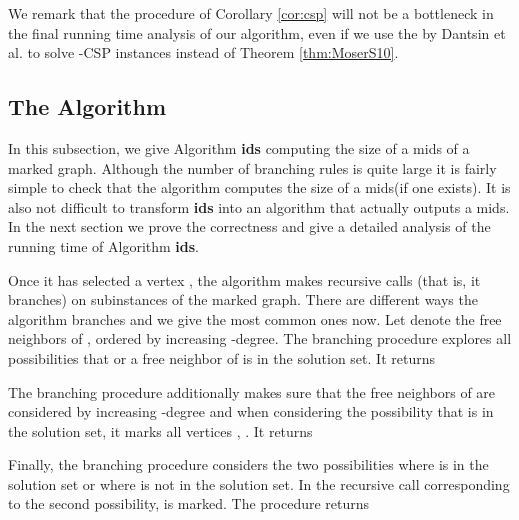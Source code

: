\documentclass[a4paper,10pt]{article}
\theoremstyle{plain}
\theoremstyle{definition}
\theoremstyle{remark}
\newcommand{\mids}{mids\xspace}
\newcommand{\CSPpb}{\textsc{CSP}\xspace}
\begin{document}
We remark that the procedure of Corollary \ref{cor:csp} will not be a bottleneck in the final
running time analysis of our algorithm, even if we use the  by Dantsin et al. \cite{Dantsin}
to solve -\CSPpb instances instead of Theorem \ref{thm:MoserS10}.

















\subsection{The Algorithm}
\label{sec:algo}

In this subsection, we give Algorithm {\bf ids} computing the size of a \mids
of a marked graph. Although the number of branching rules is quite large
it is fairly simple to check that the algorithm computes the size of
a \mids (if one exists). It is also not difficult to transform {\bf ids} into
an algorithm that actually outputs a \mids.
In the next section we prove the correctness and give a detailed analysis
of the running time of Algorithm {\bf ids}.

Once it has selected a vertex , the algorithm makes recursive calls (that is, it branches)
on subinstances of the marked graph. There are different ways the algorithm branches and we
give the most common ones now. Let  denote the free neighbors of , ordered by increasing -degree.
The branching procedure  explores all possibilities that  or a free neighbor of  is in the solution set. It returns

The branching procedure  additionally makes sure that the free neighbors of  are considered by
increasing -degree and when considering the possibility that  is in the solution set, it marks all vertices , .
It returns

Finally, the branching procedure  considers the two possibilities where  is in the solution set or
where  is not in the solution set. In the recursive call corresponding to the second possibility,  is marked.
The procedure returns
\end{document}
